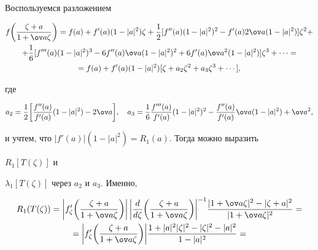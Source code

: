 \begin{pf} 


Воспользуемся разложением 


\begin{multline} 


f\bigg(\frac{\zeta+a}{1+\ov a\zeta} \bigg)=f(a)+f'(a) 


(1-|a|^2)\zeta+\frac{1}{2}[f''(a)(1-|a|^2)^2-f'(a)2\ov a 


(1-|a|^2)]\zeta^2 + \\ 


% 


+\frac{1}{6}[f'''(a)(1-|a|^2)^3-6f''(a)\ov a(1-|a|^2)^2+ 


6f'(a)\ov a^2(1-|a|^2)]\zeta^3+\dotsb= \\ 


% 


=f(a)+f'(a)(1-|a|^2)[\zeta+a_2\zeta^2+a_3\zeta^3+\dotsb], 


\end{multline} 


где 


\begin{equation} 


a_2=\frac{1}{2}\bigg[\frac{f''(a)}{f'(a)}(1-|a|^2)-2\ov a\bigg], 


\quad a_3=\frac{1}{6}\frac{f'''(a)}{f'(a)}(1-|a|^2)^2- 


\frac{f''(a)}{f'(a)}\ov a(1-|a|^2)+\ov a^2, 


\end{equation} 


и учтем, что $|f'(a)|(1-|a|^2)=R_1(a)$. Тогда можно выразить 


$R_1[T(\zeta)]$ и 


$\lambda_1[T(\zeta)]$ через $a_2$ и $a_3$. Именно, 


\begin{multline*} 


R_1(T(\zeta))=\bigg|f'_\zeta\bigg(\frac{\zeta+a} 


{1+\ov a\zeta} \bigg)\bigg|\,\bigg|\frac{d}{d\zeta} 


\bigg(\frac{\zeta+a}{1+\ov a\zeta} \bigg)\bigg|^{-1} 


\frac{|1+\ov a\zeta|^2-|\zeta+a|^2}{|1+\ov a\zeta|^2}=\\ 


% 


=\bigg|f'_\zeta\bigg(\frac{\zeta+a}{1+\ov a\zeta}\bigg)\bigg| 


\frac{1+|a|^2|\zeta|^2-|\zeta|^2-|a|^2}{1-|a|^2}= 



\end{multline*}
\end{pf}
